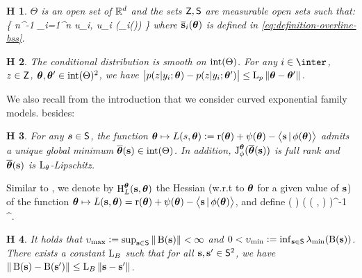 \documentclass[11pt]{article}
\newtheorem{assumption}{H\!\!}
\theoremstyle{t}
\begin{document}
\begin{assumption}\label{ass:convset}
$\Theta$ is an open set of $\rset^d$ and the sets $\Zset, \Sset$ are measurable open sets such that:
\beq
\Sset \supset \left\{  n^{-1} \sum_{i=1}^n u_i, u_i (\overline{\bss}_i(\param))  \right\}
\eeq
where $\overline{\bss}_i(\param)$ is defined in \eqref{eq:definition-overline-bss}.
\end{assumption}

\begin{assumption}\label{ass:expected}
The conditional distribution is smooth on ${\rm int}(\Param)$. For any $i \in \inter$, $z \in \Zset$, $\param, \param' \in {\rm int} (\Param)^2$, we have
$\big| p( z | y_i; \param ) - p( z | y_i; \param' ) \big| \leq  \Lip{p} \| \param - \param' \|$.
\end{assumption}

We also recall from the introduction that we consider curved exponential family models. besides:
\begin{assumption} \label{ass:reg}
For any $\bm{s} \in \Sset$, the function $\param \mapsto L(s,\param) \eqdef \Pen( \param ) + \psi( \param) - \pscal{ \bss}{ \phi ( \param) }$ admits a unique global minimum $\mstep{\bss} \in {\rm int}(\Param)$.
In addition, $\jacob{\phi}{\param}{\overline{\param}(\bss )}$ is full rank and $\overline{\param}( \bss )$ is $\Lip{\theta}$-Lipschitz.
\end{assumption}
Similar to \citep{karimi2019global}, we denote by $\hess{L}{\param}(\bss,\param)$ the Hessian (w.r.t to $\param$ for a given value of $\bss$) of the function $\param \mapsto L(\bss,\param)= \Pen(\param) + \psi(\param) -\pscal{\bss}{\phi(\param)}$, and define
\beq\label{eq:Bss}
( \bss ) \eqdef\jacob{ \phi }{ \param }{ \mstep{\bss} } \Big( ( {\bss},  \mstep{\bss} )  \Big)^{-1} \jacob{ \phi }{ \param }{ \mstep{\bss} }^\top.
\eeq
\begin{assumption}\label{ass:eigen}
It holds that $ \upsilon_{\max} \eqdef \sup_{\bss \in \Sset} \| \operatorname{B}( \bss ) \| < \infty$ and $0 < \upsilon_{\min}  \eqdef \inf_{\bss \in \Sset} \lambda_{\rm min} ( \operatorname{B}( \bss ) )$.
There exists a constant $\Lip{B}$ such that for all $\bss, \bss' \in \Sset^2$, we have $ \| \operatorname{B}( \bss ) - \operatorname{B}( \bss' )  \| \leq \Lip{B} \| {\bss} - {\bss}' \|$.
\end{assumption}
\end{document}
